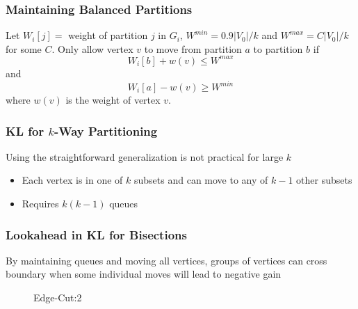 \documentclass{beamer}
\begin{document}
\begin{frame}
  \frametitle{Maintaining Balanced Partitions}

  Let $W_i[j] = $ weight of partition $j$ in $G_i$, $W^{min} = 0.9|V_0|/k$ and $W^{max} = C |V_0|/k$ for some $C$. Only allow vertex $v$ to move from partition $a$
  to partition $b$ if
  \[ W_i[b] + w(v) \leq W^{max} \]
  and
  \[ W_i[a] - w(v) \geq W^{min} \]
  where $w(v)$ is the weight of vertex $v$.
\end{frame}

\begin{frame}
  \frametitle{KL for $k$-Way Partitioning}

  Using the straightforward generalization is not practical for large $k$
  \begin{itemize}
    \item Each vertex is in one of $k$ subsets and can move to any of $k-1$ other subsets
    \item Requires $k(k-1)$ queues
  \end{itemize}

\end{frame}

\begin{frame}
  \frametitle{Lookahead in KL for Bisections}

  By maintaining queues and moving all vertices, groups of vertices can cross boundary when some individual moves will lead to negative gain

  \begin{figure}
    \caption*{Edge-Cut:2}
  \end{figure}

\end{frame}
\end{document}
